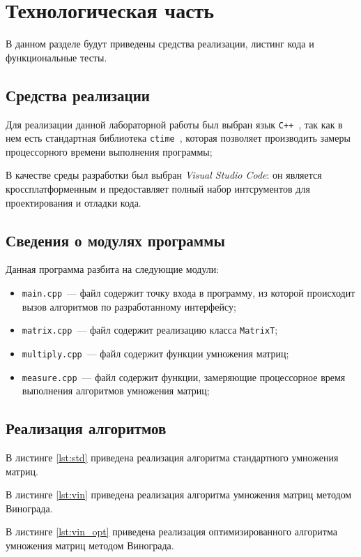\chapter{Технологическая часть}
В данном разделе будут приведены средства реализации, листинг кода и функциональные тесты.

\section{Средства реализации}
Для реализации данной лабораторной работы был выбран язык \texttt{C++}~\cite{cpp-lang}, так как в нем есть стандартная библиотека \texttt{ctime}~\cite{cpp-lang}, которая позволяет производить замеры процессорного времени выполнения программы;

В качестве среды разработки был выбран \textit{Visual Studio Code}: он является кроссплатформенным и предоставляет полный набор интсрументов для проектирования и отладки кода.
 
\section{Сведения о модулях программы}
Данная программа разбита на следующие модули:

\begin{itemize}
	\item \texttt{main.cpp}~--- файл содержит точку входа в программу, из которой происходит вызов алгоритмов по разработанному интерфейсу;
	\item \texttt{matrix.cpp}~--- файл содержит реализацию класса \texttt{MatrixT};
	\item \texttt{multiply.cpp}~--- файл содержит функции умножения матриц;
	\item \texttt{measure.cpp}~--- файл содержит функции, замеряющие процессорное время выполнения алгоритмов умножения матриц;
\end{itemize}

\section{Реализация алгоритмов}
В листинге \ref{lst:std} приведена реализация алгоритма стандартного умножения матриц.

В листинге \ref{lst:vin} приведена реализация алгоритма умножения матриц методом Винограда.

В листинге \ref{lst:vin_opt} приведена реализация оптимизированного алгоритма умножения матриц методом Винограда.

